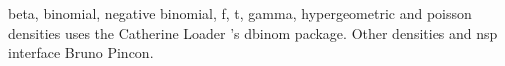 


\begin{manseealso}
\end{manseealso}


\begin{authors}
  beta, binomial, negative binomial, f, t, gamma, hypergeometric and 
  poisson densities uses the Catherine Loader 's dbinom package. Other 
  densities and nsp interface Bruno Pincon.
\end{authors}

